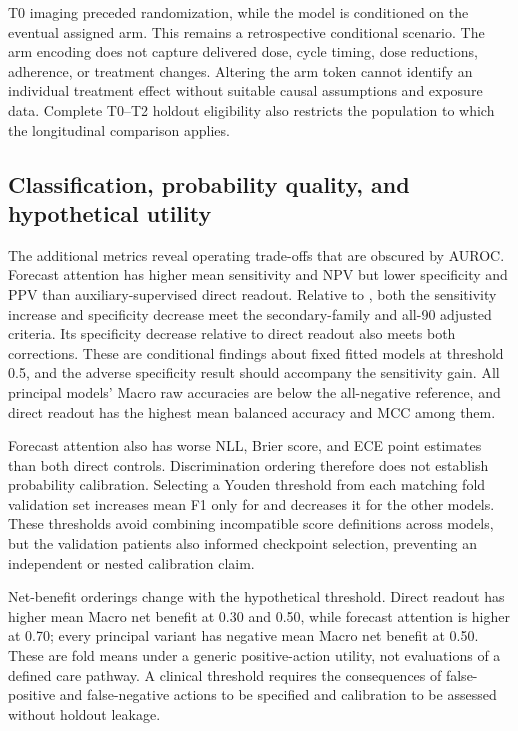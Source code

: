 T0 imaging preceded randomization, while the model is conditioned on the eventual assigned arm. This remains a retrospective conditional scenario. The arm encoding does not capture delivered dose, cycle timing, dose reductions, adherence, or treatment changes. Altering the arm token cannot identify an individual treatment effect without suitable causal assumptions and exposure data. Complete T0--T2 holdout eligibility also restricts the population to which the longitudinal comparison applies.

\subsection{Classification, probability quality, and hypothetical utility}
The additional metrics reveal operating trade-offs that are obscured by AUROC. Forecast attention has higher mean sensitivity and NPV but lower specificity and PPV than auxiliary-supervised direct readout. Relative to \nojepa{}, both the sensitivity increase and specificity decrease meet the secondary-family and all-90 adjusted criteria. Its specificity decrease relative to direct readout also meets both corrections. These are conditional findings about fixed fitted models at threshold 0.5, and the adverse specificity result should accompany the sensitivity gain. All principal models' Macro raw accuracies are below the all-negative reference, and direct readout has the highest mean balanced accuracy and MCC among them.

Forecast attention also has worse NLL, Brier score, and ECE point estimates than both direct controls. Discrimination ordering therefore does not establish probability calibration. Selecting a Youden threshold from each matching fold validation set increases mean F1 only for \nojepa{} and decreases it for the other models. These thresholds avoid combining incompatible score definitions across models, but the validation patients also informed checkpoint selection, preventing an independent or nested calibration claim.

Net-benefit orderings change with the hypothetical threshold. Direct readout has higher mean Macro net benefit at 0.30 and 0.50, while forecast attention is higher at 0.70; every principal variant has negative mean Macro net benefit at 0.50. These are fold means under a generic positive-action utility, not evaluations of a defined care pathway. A clinical threshold requires the consequences of false-positive and false-negative actions to be specified and calibration to be assessed without holdout leakage.

